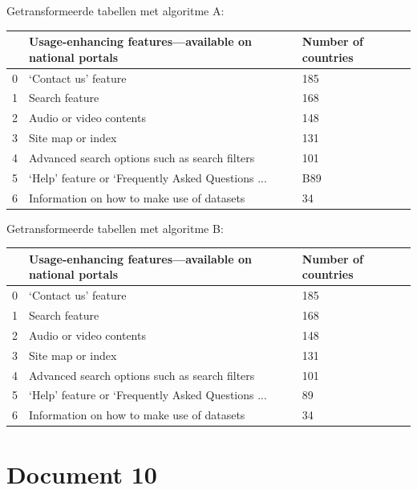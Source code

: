 Getransformeerde tabellen met algoritme A:

\begin{tabular}{lll}
\toprule
{} & Usage-enhancing features—available on national portals & Number of countries \\
\midrule
0 &                               ‘Contact us’ feature &                 185 \\
1 &                                     Search feature &                 168 \\
2 &                            Audio or video contents &                 148 \\
3 &                                  Site map or index &                 131 \\
4 &     Advanced search options such as search filters &                 101 \\
5 &  ‘Help’ feature or ‘Frequently Asked Questions ... &                 B89 \\
6 &         Information on how to make use of datasets &                  34 \\
\bottomrule
\end{tabular}

Getransformeerde tabellen met algoritme B:

\begin{tabular}{lll}
\toprule
{} & Usage-enhancing features—available on national portals & Number of countries \\
\midrule
0 &                               ‘Contact us’ feature &                 185 \\
1 &                                     Search feature &                 168 \\
2 &                            Audio or video contents &                 148 \\
3 &                                  Site map or index &                 131 \\
4 &     Advanced search options such as search filters &                 101 \\
5 &  ‘Help’ feature or ‘Frequently Asked Questions ... &                  89 \\
6 &         Information on how to make use of datasets &                  34 \\
\bottomrule
\end{tabular}
\section{Document 10}

